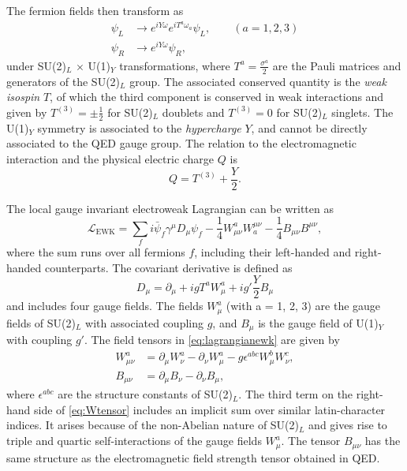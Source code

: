\noindent The fermion fields then transform as
\begin{align}
  \psi_L & \rightarrow e^{iY\omega} e^{iT^a\omega_a} \psi_L, \qquad (a = 1, 2, 3) \\
  \psi_R & \rightarrow e^{iY\omega} \psi_R,
\end{align}
under SU(2)$_L$ $\times$ U(1)$_Y$ transformations, where $T^a=\frac{\sigma^a}{2}$ are the Pauli matrices and generators of the SU(2)$_L$ group.
The associated conserved quantity is the \emph{weak isospin} $T$, of which the third component is conserved in weak interactions and given by $T^{(3)} = \pm \frac{1}{2}$ for SU(2)$_L$ doublets and $T^{(3)} = 0$ for SU(2)$_L$ singlets.
The U(1)$_Y$ symmetry is associated to the \emph{hypercharge} $Y$, and cannot be directly associated to the QED gauge group.
The relation to the electromagnetic interaction and the physical electric charge $Q$ is
\begin{equation}
  Q = T^{(3)} + \frac{Y}{2}.
\end{equation}

\noindent The local gauge invariant electroweak Lagrangian can be written as
\begin{equation}
  \mathcal{L}_{\text{EWK}} = \sum_f i\bar{\psi}_{f}\gamma^\mu D_\mu \psi_{f} - \frac{1}{4}W_{\mu\nu}^aW^{\mu\nu}_{a} - \frac{1}{4} B_{\mu\nu}B^{\mu\nu}, 
  \label{eq:lagrangianewk}
\end{equation}
where the sum runs over all fermions $f$, including their left-handed and right-handed counterparts.
The covariant derivative is defined as
\begin{equation}
  D_\mu = \partial_\mu + igT^aW_\mu^a + ig'\frac{Y}{2}B_\mu 
  \label{eq:covdevewk}
\end{equation}
and includes four gauge fields. The fields $W^a_\mu$ (with a = 1, 2, 3) are the gauge fields of SU(2)$_L$ with associated coupling $g$, and $B_\mu$ is the gauge field of U(1)$_Y$ with coupling $g'$.
The field tensors in \cref{eq:lagrangianewk} are given by
\begin{align}
  W_{\mu\nu}^a & = \partial_\mu W_\nu^a - \partial_\nu W_\mu^a - g \epsilon^{abc} W^b_\mu W^c_\nu, \label{eq:Wtensor} \\
  B_{\mu\nu}   & = \partial_\mu B_\nu - \partial_\nu B_\mu,
\end{align}
where $\epsilon^{abc}$ are the structure constants of SU(2)$_L$. The third term on the right-hand side of \cref{eq:Wtensor} includes an implicit sum over similar latin-character indices. It arises because of the non-Abelian nature of SU(2)$_L$ and gives rise to triple and quartic self-interactions of the gauge fields $W_{\mu}^a$.
The tensor $B_{\mu\nu}$ has the same structure as the electromagnetic field strength tensor obtained in QED.

